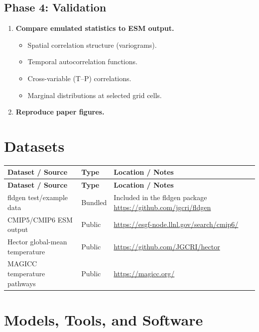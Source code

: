 \documentclass[11pt,a4paper]{article}
\begin{document}
\subsection{Phase 4: Validation}
\begin{enumerate}[label=\textbf{4.\arabic*}]
  \item \textbf{Compare emulated statistics to ESM output.}
    \begin{itemize}
      \item Spatial correlation structure (variograms).
      \item Temporal autocorrelation functions.
      \item Cross-variable (T--P) correlations.
      \item Marginal distributions at selected grid cells.
    \end{itemize}
  \item \textbf{Reproduce paper figures.}
\end{enumerate}

\section{Datasets}

\begin{longtable}{p{4.5cm} p{3.5cm} p{6cm}}
\toprule
\textbf{Dataset / Source} & \textbf{Type} & \textbf{Location / Notes} \\
\midrule
\endfirsthead
\toprule
\textbf{Dataset / Source} & \textbf{Type} & \textbf{Location / Notes} \\
\midrule
\endhead
fldgen test/example data & Bundled & Included in the fldgen package \newline \url{https://github.com/jgcri/fldgen} \\
\midrule
CMIP5/CMIP6 ESM output & Public & \url{https://esgf-node.llnl.gov/search/cmip6/} \\
\midrule
Hector global-mean temperature & Public & \url{https://github.com/JGCRI/hector} \\
\midrule
MAGICC temperature pathways & Public & \url{https://magicc.org/} \\
\bottomrule
\end{longtable}

\section{Models, Tools, and Software}
\end{document}
